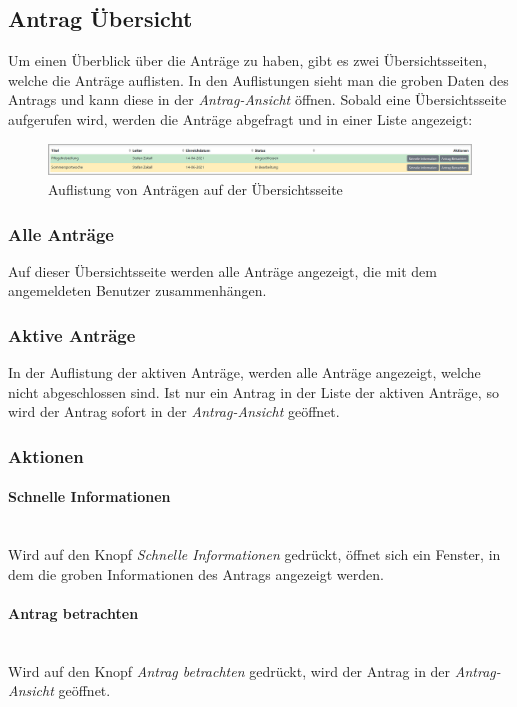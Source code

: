 \subsection{Antrag Übersicht}
\label{sec:antrag_uebersicht}
Um einen Überblick über die Anträge zu haben, gibt es zwei Übersichtsseiten, welche die Anträge auflisten. In den Auflistungen sieht man die groben Daten des Antrags und kann diese in der \textit{Antrag-Ansicht} öffnen. Sobald eine Übersichtsseite aufgerufen wird, werden die Anträge abgefragt und in einer Liste angezeigt:
\begin{figure}[H]
	\centering
	\includegraphics[width=1\linewidth]{images/rfoster_implementierung/liste_antrag}
	\caption[Liste der Anträge]{Auflistung von Anträgen auf der Übersichtsseite}
	\label{fig:listeantrag}
\end{figure}

\subsubsection{Alle Anträge}
Auf dieser Übersichtsseite werden alle Anträge angezeigt, die mit dem angemeldeten Benutzer zusammenhängen.
\subsubsection{Aktive Anträge}
In der Auflistung der aktiven Anträge, werden alle Anträge angezeigt, welche nicht abgeschlossen sind. Ist nur ein Antrag in der Liste der aktiven Anträge, so wird der Antrag sofort in der \textit{Antrag-Ansicht} geöffnet.
\subsubsection{Aktionen}
\paragraph{Schnelle Informationen}~\\
Wird auf den Knopf \textit{Schnelle Informationen} gedrückt, öffnet sich ein Fenster, in dem die groben Informationen des Antrags angezeigt werden.
\paragraph{Antrag betrachten}~\\
Wird auf den Knopf \textit{Antrag betrachten} gedrückt, wird der Antrag in der \textit{Antrag-Ansicht} geöffnet.
\newpage

